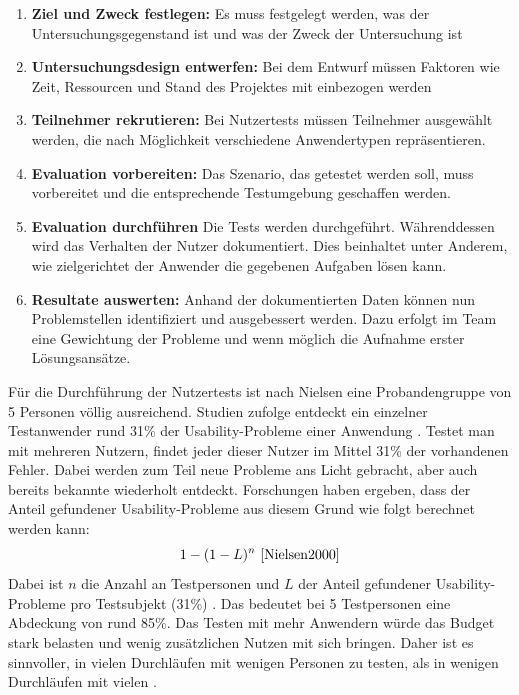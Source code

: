 \begin{enumerate}
	\item \textbf{Ziel und Zweck festlegen:} Es muss festgelegt werden, was der Untersuchungsgegenstand ist und was der Zweck der Untersuchung ist
	\item \textbf{Untersuchungsdesign entwerfen:} Bei dem Entwurf müssen Faktoren wie Zeit, Ressourcen und Stand des Projektes mit einbezogen werden
	\item \textbf{Teilnehmer rekrutieren:} Bei Nutzertests müssen Teilnehmer ausgewählt werden, die nach Möglichkeit verschiedene Anwendertypen repräsentieren.
	\item \textbf{Evaluation vorbereiten:} Das Szenario, das getestet werden soll, muss vorbereitet und die entsprechende Testumgebung geschaffen werden.
	\item \textbf{Evaluation durchführen} Die Tests werden durchgeführt. Währenddessen wird das Verhalten der Nutzer dokumentiert. Dies beinhaltet unter Anderem, wie zielgerichtet der Anwender die gegebenen Aufgaben lösen kann.
	\item \textbf{Resultate auswerten:} Anhand der dokumentierten Daten können nun Problemstellen identifiziert und ausgebessert werden. Dazu erfolgt im Team eine Gewichtung der Probleme und wenn möglich die Aufnahme erster Lösungsansätze.
\end{enumerate}
Für die Durchführung der Nutzertests ist nach Nielsen eine Probandengruppe von 5 Personen völlig ausreichend. Studien zufolge entdeckt ein einzelner Testanwender rund 31\% der Usability-Probleme einer Anwendung \cite{Nielsen2000}. Testet man mit mehreren Nutzern, findet jeder dieser Nutzer im Mittel 31\% der vorhandenen Fehler. Dabei werden zum Teil neue Probleme ans Licht gebracht, aber auch bereits bekannte wiederholt entdeckt. Forschungen haben ergeben, dass der Anteil gefundener Usability-Probleme aus diesem Grund wie folgt berechnet werden kann:
\begin{equation}
			1-(1-L)^n\text{ \cite{Nielsen2000}}
\end{equation}
Dabei ist \(n\) die Anzahl an Testpersonen und \(L\) der Anteil gefundener Usability-Probleme pro Testsubjekt (31\%) \cite{Nielsen2000}. Das bedeutet bei 5 Testpersonen eine Abdeckung von rund 85\%. Das Testen mit mehr Anwendern würde das Budget stark belasten und wenig zusätzlichen Nutzen mit sich bringen. Daher ist es sinnvoller, in vielen Durchläufen mit wenigen Personen zu testen, als in wenigen Durchläufen mit vielen \cite{Nielsen2000}.\par
